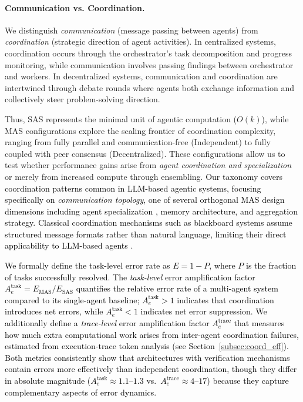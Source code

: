 \vspace{0.4em}
\paragraph{Communication vs. Coordination.}
We distinguish \emph{communication} (message passing between agents) from \emph{coordination} (strategic direction of agent activities). In centralized systems, coordination occurs through the orchestrator's task decomposition and progress monitoring, while communication involves passing findings between orchestrator and workers. In decentralized systems, communication and coordination are intertwined through debate rounds where agents both exchange information and collectively steer problem-solving direction.

Thus, SAS represents the minimal unit of agentic computation ($O(k)$), while MAS configurations explore the scaling frontier of coordination complexity, ranging from fully parallel and communication-free (Independent) to fully coupled with peer consensus (Decentralized). These configurations allow us to test whether performance gains arise from \emph{agent coordination and specialization} or merely from increased compute through ensembling. \textcolor{black}{Our taxonomy covers coordination patterns common in LLM-based agentic systems, focusing specifically on \emph{communication topology}, one of several orthogonal MAS design dimensions including agent specialization \citep{hong2024metagpt}, memory architecture, and aggregation strategy. Classical coordination mechanisms such as blackboard systems assume structured message formats rather than natural language, limiting their direct applicability to LLM-based agents \citep{guo2024large, xi2025rise}.}

\textcolor{black}{We formally define the task-level error rate as $E = 1 - P$, where $P$ is the fraction of tasks successfully resolved. The \emph{task-level} error amplification factor $A_e^{\text{task}} = E_{\text{MAS}} / E_{\text{SAS}}$ quantifies the relative error rate of a multi-agent system compared to its single-agent baseline; $A_e^{\text{task}} > 1$ indicates that coordination introduces net errors, while $A_e^{\text{task}} < 1$ indicates net error suppression. We additionally define a \emph{trace-level} error amplification factor $A_e^{\text{trace}}$ that measures how much extra computational work arises from inter-agent coordination failures, estimated from execution-trace token analysis (see Section~\ref{subsec:coord_eff}). Both metrics consistently show that architectures with verification mechanisms contain errors more effectively than independent coordination, though they differ in absolute magnitude ($A_e^{\text{task}} \approx 1.1$--$1.3$ vs.\ $A_e^{\text{trace}} \approx 4$--$17$) because they capture complementary aspects of error dynamics.}


